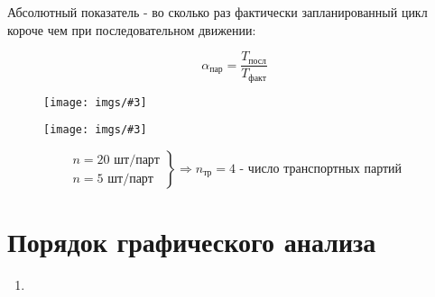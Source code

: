 \documentclass[14pt,a4paper,oneside]{extarticle}
\newcommand{\pic}[3]{
	\begin{figure}[#1]
		\begin{center}
			\texttt{[image: imgs/\#3]}
		\end{center}
	\end{figure}
}
\begin{document}
Абсолютный показатель -  во сколько раз фактически запланированный цикл короче чем при последовательном движении:

\[\alpha_\text{пар}=\frac{T_\text{посл}}{T_\text{факт}}\]

\pic{H}{\textwidth/2}{15}

\pic{H}{\textwidth}{16}

$$
 \left.
    \begin{array}{ll}
        n=20\text{ шт/парт} \\
        n=5\text{ шт/парт}
    \end{array}
\right \}\Longrightarrow n_\text{тр}=4\text{ - число транспортных партий}
$$

\section{Порядок графического анализа}

\begin{enumerate}
    \item 
\end{enumerate}
\end{document}
